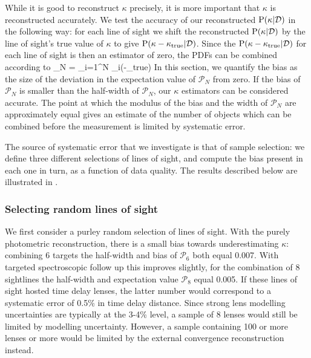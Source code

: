 \documentclass[useAMS,usenatbib]{mn2e}
\begin{document}
While it is good to reconstruct $\kappa$ precisely, it is more important that
$\kappa$ is reconstructed accurately. 
We test the accuracy of our reconstructed ${\rm P}(\kappa|{\mathcal{D}})$ in the following
way: for each line of sight we shift the reconstructed ${\rm P}(\kappa|{\mathcal{D}})$ by
the line of sight's true value of $\kappa$ to give
${\rm P}(\kappa-\kappa_{\rm true}|{\mathcal{D}})$. Since the ${\rm P}(\kappa-\kappa_{\rm true}|{\mathcal{D}})$ for
each line of sight is then an \independant estimator of zero, the PDFs can be
combined according to
\be
\label{eq:bias}
_N = \prod_{i=1}^N \pr_i(\kappa-\kappa_{\rm true})
\ee
In this section, we quantify the bias as the size of the deviation in the
expectation value of $\mathcal{P}_N$ from zero. If the bias of $\mathcal{P}_N$
is smaller than the half-width of $\mathcal{P}_N$, our $\kappa$ estimators can
be considered accurate. 
The point at which the modulus of the bias and the width of $\mathcal{P}_N$
are approximately equal gives an estimate of the number of objects which can
be combined before the measurement is limited by systematic error.


The source of systematic error that we investigate  is that of sample
selection: we define three different selections of lines of sight, and compute
the bias present in each one in turn, as a function of data quality. The
results described below are illustrated in .


\subsubsection{Selecting random lines of sight}
\label{sec:bias:random}

We first consider a purley random selection of lines of sight. With the purely
photometric reconstruction, there is a small bias towards underestimating
$\kappa$: combining 6 targets the half-width and bias of $\mathcal{P}_{6}$
both equal 0.007. With targeted spectroscopic follow up this improves
slightly, for the combination of 8 sightlines the half-width and expectation
value  $\mathcal{P}_{8}$ equal 0.005.  If these lines of sight hosted time
delay lenses, the latter number would correspond to a systematic error of
0.5\% in time delay distance. Since strong lens modelling uncertainties are
typically at the 3-4\% level, a sample of 8 lenses would still be limited by
modelling uncertainty. However, a sample containing 100 or more lenses or more
would be limited by the external convergence reconstruction instead.
\end{document}
